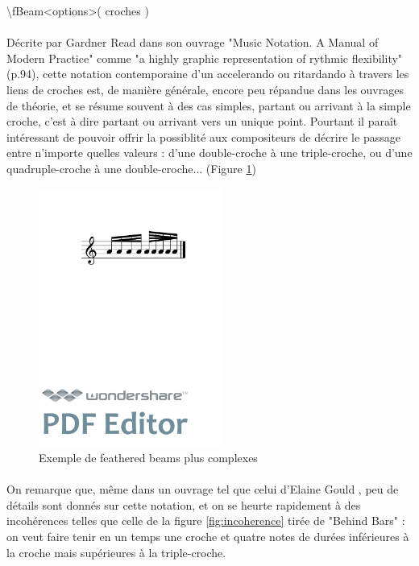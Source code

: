 \documentclass[a4paper,10pt,twocolumn]{article}
\newenvironment{code}
  {\fontfamily{pnc}\selectfont}{}
\begin{document}
\begin{code}
\textbackslash{}fBeam\textless{}options\textgreater{}( croches )
\end{code}
\\

\paragraph{}
Décrite par Gardner Read dans son ouvrage "Music Notation. A Manual of Modern Practice" \cite{ref8} comme "a highly graphic representation of rythmic flexibility"(p.94), cette notation contemporaine d'un accelerando ou ritardando à travers les liens de croches est, de manière générale, encore peu répandue dans les ouvrages de théorie, et se résume souvent à des cas simples, partant ou arrivant à la simple croche, c'est à dire partant ou arrivant vers un unique point. Pourtant il paraît intéressant de pouvoir offrir la possiblité aux compositeurs de décrire le passage entre n'importe quelles valeurs : d'une double-croche à une triple-croche, ou d'une quadruple-croche à une double-croche... (Figure \ref{fig:fbeamcomplex})

\begin{figure}[h]
\centering
\includegraphics[width=6cm]{img/fbeamcomplex.pdf}
\caption{Exemple de feathered beams plus complexes}
\label{fig:fbeamcomplex}
\end{figure}


\paragraph{}
On remarque que, même dans un ouvrage tel que celui d'Elaine Gould \cite{ref2}, peu de détails sont donnés sur cette notation, et on se heurte rapidement à des incohérences telles que celle de la figure \ref{fig:incoherence} tirée de "Behind Bars" : on veut faire tenir en un temps une croche et quatre notes de durées inférieures à la croche mais supérieures à la triple-croche. 
\end{document}
